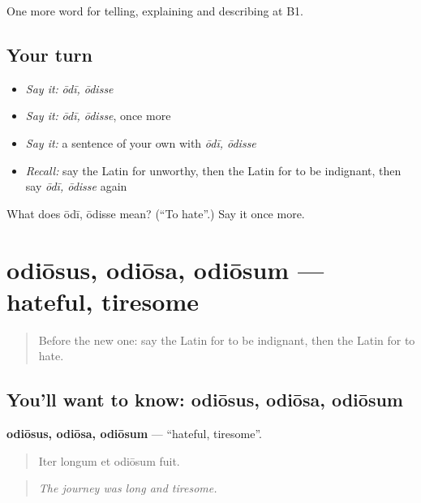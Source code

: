 \begin{grammarlens}[title={What you've built}]
One more word for telling, explaining and describing at B1.
\end{grammarlens}

\subsection*{Your turn}
\begin{itemize}
\raggedright
  \item \emph{Say it:} \emph{ōdī, ōdisse}
  \item \emph{Say it:} \emph{ōdī, ōdisse}, once more
  \item \emph{Say it:} a sentence of your own with \emph{ōdī, ōdisse}
  \item \emph{Recall:} say the Latin for unworthy, then the Latin for to be indignant, then say \emph{ōdī, ōdisse} again
\end{itemize}

\begin{tcolorbox}[breakable,colback=teal!4,colframe=teal!35!black,title={Before you move on}]
What does ōdī, ōdisse mean? (\textquotedblleft{}To hate\textquotedblright{}.) Say it once more.
\end{tcolorbox}
\section[odiōsus, odiōsa, odiōsum]{odiōsus, odiōsa, odiōsum — hateful, tiresome}

\label{lesson:LA-C494-odiosus}



\begin{quote}
Before the new one: say the Latin for to be indignant, then the Latin for to hate.
\end{quote}

\subsection*{You'll want to know: odiōsus, odiōsa, odiōsum}
\textbf{odiōsus, odiōsa, odiōsum} — \textquotedblleft{}hateful, tiresome\textquotedblright{}.

\begin{quote}
Iter longum et odiōsum fuit.
\end{quote}

\begin{quote}
\emph{The journey was long and tiresome.}
\end{quote}

